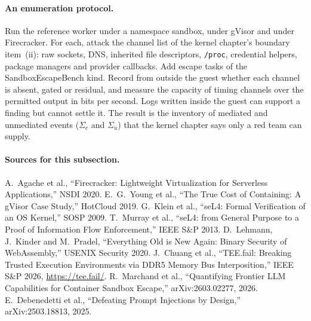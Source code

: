 \paragraph{An enumeration protocol.}
Run the reference worker under a namespace sandbox, under gVisor and under
Firecracker. For each, attack the channel list of the kernel chapter's
boundary item~(ii): raw sockets, DNS, inherited file descriptors,
\texttt{/proc}, credential helpers, package managers and provider callbacks.
Add escape tasks of the SandboxEscapeBench kind. Record from outside the guest
whether each channel is absent, gated or residual, and measure the capacity of
timing channels over the permitted output in bits per second. Logs written
inside the guest can support a finding but cannot settle it. The result is the
inventory of mediated and unmediated events ($\Sigma_c$ and $\Sigma_u$) that
the kernel chapter says only a red team can supply.

\paragraph{Sources for this subsection.}
{\footnotesize
A.~Agache et al., ``Firecracker: Lightweight Virtualization for Serverless
Applications,'' NSDI 2020.
E.~G.~Young et al., ``The True Cost of Containing: A gVisor Case Study,''
HotCloud 2019.
G.~Klein et al., ``seL4: Formal Verification of an OS Kernel,'' SOSP 2009.
T.~Murray et al., ``seL4: from General Purpose to a Proof of Information Flow
Enforcement,'' IEEE S\&P 2013.
D.~Lehmann, J.~Kinder and M.~Pradel, ``Everything Old is New Again: Binary
Security of WebAssembly,'' USENIX Security 2020.
J.~Chuang et al., ``TEE.fail: Breaking Trusted Execution Environments via DDR5
Memory Bus Interposition,'' IEEE S\&P 2026, \url{https://tee.fail/}.
R.~Marchand et al., ``Quantifying Frontier LLM Capabilities for Container
Sandbox Escape,'' arXiv:2603.02277, 2026.
E.~Debenedetti et al., ``Defeating Prompt Injections by Design,''
arXiv:2503.18813, 2025.\par}
